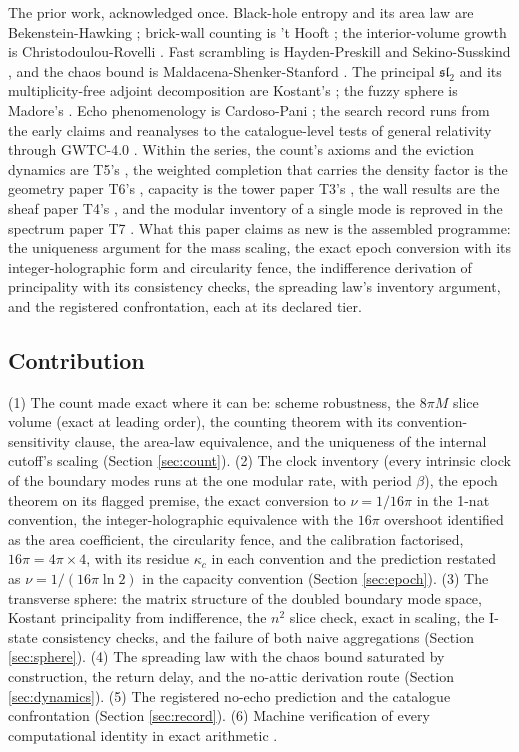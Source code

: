 \documentclass[11pt]{article}
\theoremstyle{definition}
\begin{document}
The prior work, acknowledged once. Black-hole entropy and its area law are Bekenstein-Hawking \cite{Bekenstein1973, Hawking1975}; brick-wall counting is 't Hooft \cite{tHooft1985}; the interior-volume growth is Christodoulou-Rovelli \cite{ChristodoulouRovelli2015}. Fast scrambling is Hayden-Preskill and Sekino-Susskind \cite{HaydenPreskill2007, SekinoSusskind2008}, and the chaos bound is Maldacena-Shenker-Stanford \cite{MSS2016}. The principal $\mathfrak{sl}_2$ and its multiplicity-free adjoint decomposition are Kostant's \cite{Kostant1959}; the fuzzy sphere is Madore's \cite{Madore1992}. Echo phenomenology is Cardoso-Pani \cite{CardosoPani2017}; the search record runs from the early claims and reanalyses \cite{Abedi2017, Westerweck2018} to the catalogue-level tests of general relativity through GWTC-4.0 \cite{GWTC4TGR2026}. Within the series, the count's axioms and the eviction dynamics are T5's \cite{ButlerT5}, the weighted completion that carries the density factor is the geometry paper T6's \cite{ButlerT6}, capacity is the tower paper T3's \cite{ButlerT3}, the wall results are the sheaf paper T4's \cite{ButlerT4}, and the modular inventory of a single mode is reproved in the spectrum paper T7 \cite{ButlerT7}. What this paper claims as new is the assembled programme: the uniqueness argument for the mass scaling, the exact epoch conversion with its integer-holographic form and circularity fence, the indifference derivation of principality with its consistency checks, the spreading law's inventory argument, and the registered confrontation, each at its declared tier.

\subsection*{Contribution}

(1) The count made exact where it can be: scheme robustness, the $8\pi M$ slice volume (exact at leading order), the counting theorem with its convention-sensitivity clause, the area-law equivalence, and the uniqueness of the internal cutoff's scaling (Section \ref{sec:count}). (2) The clock inventory (every intrinsic clock of the boundary modes runs at the one modular rate, with period $\beta$), the epoch theorem on its flagged premise, the exact conversion to $\nu = 1/16\pi$ in the 1-nat convention, the integer-holographic equivalence with the $16\pi$ overshoot identified as the area coefficient, the circularity fence, and the calibration factorised, $16\pi = 4\pi \times 4$, with its residue $\kappa_c$ in each convention and the prediction restated as $\nu = 1/(16\pi\ln 2)$ in the capacity convention (Section \ref{sec:epoch}). (3) The transverse sphere: the matrix structure of the doubled boundary mode space, Kostant principality from indifference, the $n^2$ slice check, exact in scaling, the I-state consistency checks, and the failure of both naive aggregations (Section \ref{sec:sphere}). (4) The spreading law with the chaos bound saturated by construction, the return delay, and the no-attic derivation route (Section \ref{sec:dynamics}). (5) The registered no-echo prediction and the catalogue confrontation (Section \ref{sec:record}). (6) Machine verification of every computational identity in exact arithmetic \cite{ButlerVerifyT8}.
\end{document}

